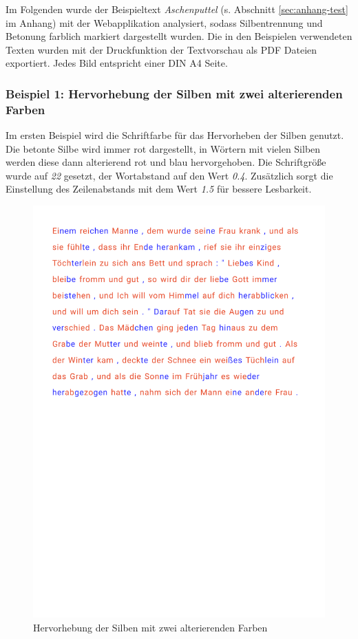 Im Folgenden wurde der Beispieltext \textit{Aschenputtel} (s. Abschnitt \ref{sec:anhang-test} im Anhang) mit der Webapplikation analysiert, sodass Silbentrennung und Betonung farblich markiert dargestellt wurden. Die in den Beispielen verwendeten Texten wurden mit der Druckfunktion der Textvorschau als PDF Dateien exportiert. Jedes Bild entspricht einer DIN A4 Seite.

\subsubsection{Beispiel 1: Hervorhebung der Silben mit zwei alterierenden Farben}

Im ersten Beispiel wird die Schriftfarbe für das Hervorheben der Silben genutzt. Die betonte Silbe wird immer rot dargestellt, in Wörtern mit vielen Silben werden diese dann alterierend rot und blau hervorgehoben. Die Schriftgröße wurde auf \textit{22} gesetzt, der Wortabstand auf den Wert \textit{0.4}. Zusätzlich sorgt die Einstellung des Zeilenabstands mit dem Wert \textit{1.5} für bessere Lesbarkeit.

\begin{figure}[h!]
	\centering
	\includegraphics[width=.7\linewidth, frame]{figures/evaluation/annotation1}
	\caption{Hervorhebung der Silben mit zwei alterierenden Farben}
	\label{fig:evaluation-ex1}
\end{figure}
\newpage

